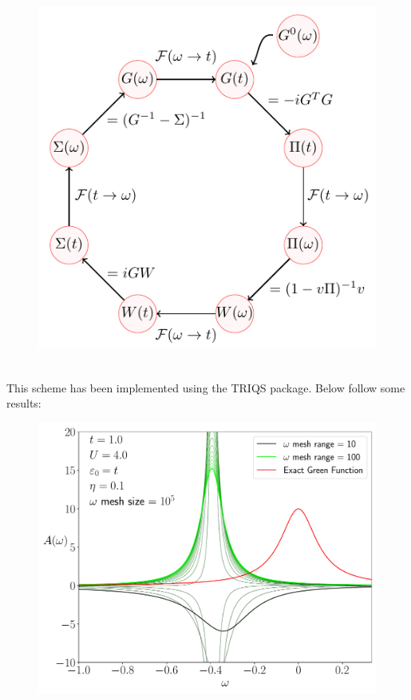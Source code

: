 \documentclass[12pt]{article}
\begin{document}
\begin{figure}[h!]
\center
\includegraphics[scale=1.2]{images2.pdf}
\end{figure}\\
\newpage
\noindent
This scheme has been implemented using the TRIQS package. Below follow some results:
\begin{figure}[h!]
\center
\includegraphics[scale=0.6]{wcomp.pdf}
\end{figure}
\end{document}
